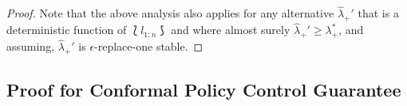 \begin{proof}

Note that the above analysis also applies for any alternative $\hat\lambda_+'$ that is a deterministic function of $\lbag l_{1:n}\rbag$ and where almost surely $\hat\lambda_+'\geq \lambda_+^*$, and assuming, $\hat\lambda_+'$ is $\epsilon$-replace-one stable. 

    
\end{proof}



\subsection{Proof for Conformal Policy Control Guarantee}
\label{app:cpc_proof}




